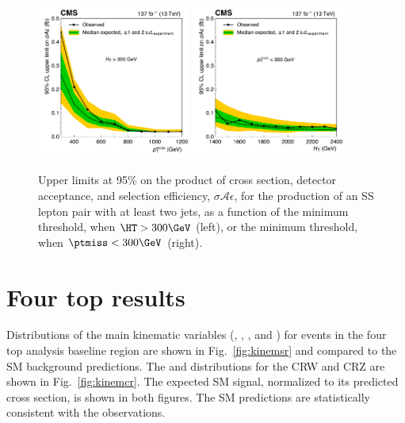 \begin{figure}[!hbtp]
\centering
\includegraphics[width=0.45\textwidth]{figs/ssp/scan_milimits_met.pdf}
\includegraphics[width=0.45\textwidth]{figs/ssp/scan_milimits_ht.pdf}
\caption{Upper limits at 95\% \CL on the product of cross section, detector acceptance, and selection efficiency, $\sigma \! \mathcal{A} \epsilon$,
for the production of an SS lepton pair with at least two jets, as a function of the minimum \ptmiss threshold, when $\HT>300\GeV$ (left), or the minimum \HT threshold, when $\ptmiss<300\GeV$ (right).
    }
\label{fig:milimits}
\end{figure}



\section{Four top results}
\label{sec:ftresults}

Distributions of the main kinematic variables (\Njets, \Nbjets, \HT, and
\ptmiss) for events in the four top analysis baseline region are shown in Fig.~\ref{fig:kinemsr} and compared
to the SM background predictions. The \Njets and \Nbjets distributions for
the CRW and CRZ are shown in Fig.~\ref{fig:kinemcr}. The expected SM \tttt
signal, normalized to its predicted cross section, is shown in both figures.
The SM predictions are statistically consistent with the observations.

